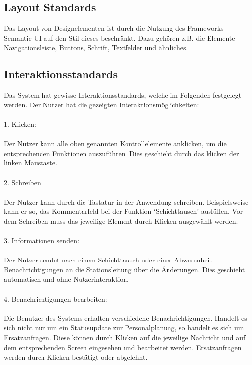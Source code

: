 \documentclass[11pt,
paper=a4,
bibtotocnumbered,	  %
liststotocnumbered,  %
DIV=calc,		  %
tablecaptionabove,	  %
headinclude,
]{article}
\begin{document}
\subsection{Layout Standards}
Das Layout von Designelementen ist durch die Nutzung des Frameworks Semantic UI auf den Stil dieses beschränkt. Dazu gehören z.B. die Elemente Navigationsleiste, Buttons, Schrift, Textfelder und ähnliches.
\subsection{Interaktionsstandards}
Das System hat gewisse Interaktionsstandards, welche im Folgenden festgelegt werden. Der Nutzer hat die gezeigten Interaktionsmöglichkeiten: \\\\

1. Klicken: \\\\
Der Nutzer kann alle oben genannten Kontrollelemente anklicken, um die entsprechenden Funktionen auszuführen. Dies geschieht durch das klicken der linken Maustaste. \\\\
2. Schreiben:\\\\
Der Nutzer kann durch die Tastatur in der Anwendung schreiben. Beispielsweise kann er so, das Kommentarfeld bei der Funktion ‘Schichttausch’ ausfüllen. Vor dem Schreiben muss das jeweilige Element durch Klicken ausgewählt werden. \\\\
3. Informationen senden:\\\\
Der Nutzer sendet nach einem Schichttausch oder einer Abwesenheit Benachrichtigungen an die Stationsleitung über die Änderungen. Dies geschieht automatisch und ohne Nutzerinteraktion.\\\\
4. Benachrichtigungen bearbeiten:\\\\
Die Benutzer des Systems erhalten verschiedene Benachrichtigungen. Handelt es sich nicht nur um ein Statusupdate zur Personalplanung, so handelt es sich um Ersatzanfragen. Diese können durch Klicken auf die jeweilige Nachricht und auf dem entsprechenden Screen eingesehen und bearbeitet werden. Ersatzanfragen werden durch Klicken bestätigt oder abgelehnt.
\end{document}
